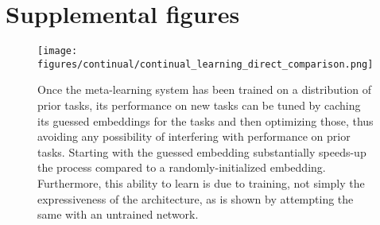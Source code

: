 \documentclass{article}
\begin{document}
\section{Supplemental figures}
\begin{figure}[H]
\centering
\texttt{[image: figures/continual/continual\_learning\_direct\_comparison.png]}
\caption{Once the meta-learning system has been trained on a distribution of prior tasks, its performance on new tasks can be tuned by caching its guessed embeddings for the tasks and then optimizing those, thus avoiding any possibility of interfering with performance on prior tasks. Starting with the guessed embedding substantially speeds-up the process compared to a randomly-initialized embedding. Furthermore, this ability to learn is due to training, not simply the expressiveness of the architecture, as is shown by attempting the same with an untrained network.}
\label{supp_poly_continual_results}
\end{figure}
\end{document}
